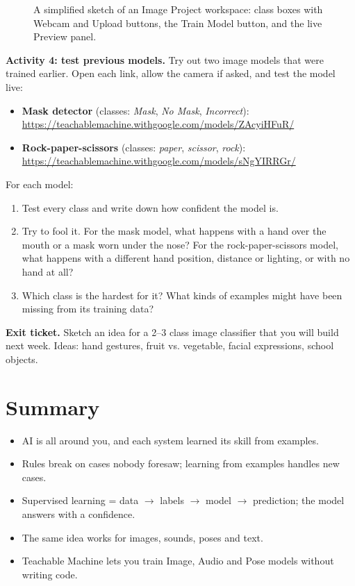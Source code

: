 \begin{figure}[htbp]
\centering
{}
\caption{A simplified sketch of an Image Project workspace: class boxes with Webcam and Upload buttons, the Train Model button, and the live Preview panel.}\label{fig:tm-workspace}
\end{figure}

\textbf{Activity 4: test previous models.} Try out two image models that were trained earlier. Open each link, allow the camera if asked, and test the model live:


\begin{itemize}
\item \textbf{Mask detector} (classes: \emph{Mask}, \emph{No Mask}, \emph{Incorrect}): \href{https://teachablemachine.withgoogle.com/models/ZAcyiHFuR/}{https://teachablemachine.withgoogle.com/models/ZAcyiHFuR/}
\item \textbf{Rock-paper-scissors} (classes: \emph{paper}, \emph{scissor}, \emph{rock}): \href{https://teachablemachine.withgoogle.com/models/sNgYIRRGr/}{https://teachablemachine.withgoogle.com/models/sNgYIRRGr/}
\end{itemize}

For each model:


\begin{enumerate}
\item Test every class and write down how confident the model is.
\item Try to fool it. For the mask model, what happens with a hand over the mouth or a mask worn under the nose? For the rock-paper-scissors model, what happens with a different hand position, distance or lighting, or with no hand at all?
\item Which class is the hardest for it? What kinds of examples might have been missing from its training data?
\end{enumerate}

\textbf{Exit ticket.} Sketch an idea for a 2–3 class image classifier that you will build next week. Ideas: hand gestures, fruit vs. vegetable, facial expressions, school objects.


\section*{Summary}

\begin{itemize}
\item AI is all around you, and each system learned its skill from examples.
\item Rules break on cases nobody foresaw; learning from examples handles new cases.
\item Supervised learning = data \ensuremath{\rightarrow} labels \ensuremath{\rightarrow} model \ensuremath{\rightarrow} prediction; the model answers with a confidence.
\item The same idea works for images, sounds, poses and text.
\item Teachable Machine lets you train Image, Audio and Pose models without writing code.
\end{itemize}

